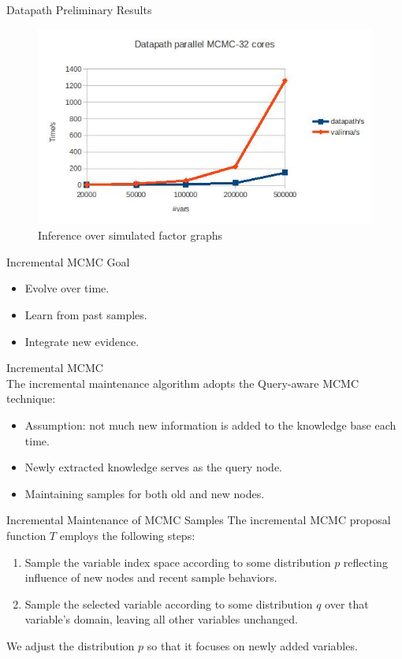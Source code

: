 \documentclass[onlymath,xcolor=pdftex,dvipsnames,table]{beamer}
\newcommand{\head}[1]{{\large\color{OliveGreen}#1\\[5pt]}}
\begin{document}
\begin{frame}{Datapath Preliminary Results}
\begin{figure}
  \centering
  \caption{Inference over simulated factor graphs}
  \includegraphics[width=.5\textwidth]{datapath.jpg}
\end{figure}
\end{frame}

\begin{frame}{Incremental MCMC}
\head{Goal}
\begin{itemize}
  \item Evolve over time.
  \item Learn from past samples.
  \item Integrate new evidence.
\end{itemize}

\head{Incremental MCMC}
The incremental maintenance algorithm adopts the Query-aware MCMC~\cite{wick2011queryaware} technique:
\begin{itemize}
\item Assumption: not much new information is added to the knowledge base each time.
\item Newly extracted knowledge serves as the query node.
\item Maintaining samples for both old and new nodes.
\end{itemize}
\end{frame}

\begin{frame}{Incremental Maintenance of MCMC Samples}
The incremental MCMC proposal function $T$ employs the following steps:
\begin{enumerate}
  \item Sample the variable index space according to some distribution $p$ reflecting influence of new nodes and recent sample behaviors.
  \item Sample the selected variable according to some distribution $q$ over that variable's domain, leaving all other variables unchanged.
\end{enumerate}
We adjust the distribution $p$ so that it focuses on newly added variables.
\end{frame}
\end{document}

